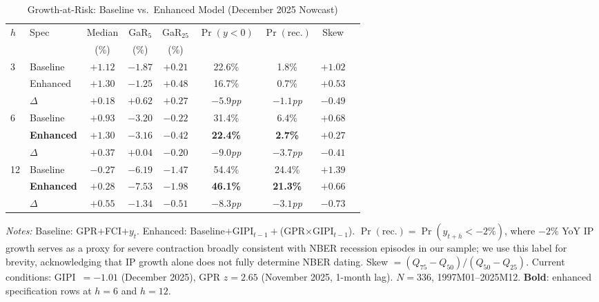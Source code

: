 \documentclass[12pt]{article}
\begin{document}
\begin{table}[htbp]\begin{center}
\caption{Growth-at-Risk: Baseline vs.\ Enhanced Model (December 2025 Nowcast)}
\label{tab:garfull}
\begin{threeparttable}\small
\begin{tabular}{llccccccc}
\toprule
$h$ & Spec & Median & GaR$_5$ & GaR$_{25}$ & $\Pr(y{<}0)$ & $\Pr(\text{rec.})$ & Skew\\
&& (\%) & (\%) & (\%) & & &\\
\midrule
\multirow{3}{*}{3}
& Baseline & $+1.12$ & $-1.87$ & $+0.21$ & 22.6\% & 1.8\% & $+1.02$\\
& Enhanced & $+1.30$ & $-1.25$ & $+0.48$ & 16.7\% & 0.7\% & $+0.53$\\
& \textit{$\Delta$} & \textit{$+0.18$} & \textit{$+0.62$} & \textit{$+0.27$} &
  \textit{$-5.9$pp} & \textit{$-1.1$pp} & \textit{$-0.49$}\\
\midrule
\multirow{3}{*}{6}
& Baseline & $+0.93$ & $-3.20$ & $-0.22$ & 31.4\% & 6.4\% & $+0.68$\\
& \textbf{Enhanced} & $\mathbf{+1.30}$ & $-3.16$ & $-0.42$ & \textbf{22.4\%} &
  \textbf{2.7\%} & $+0.27$\\
& \textit{$\Delta$} & \textit{$+0.37$} & \textit{$+0.04$} & \textit{$-0.20$} &
  \textit{$-9.0$pp} & \textit{$-3.7$pp} & \textit{$-0.41$}\\
\midrule
\multirow{3}{*}{12}
& Baseline & $-0.27$ & $-6.19$ & $-1.47$ & 54.4\% & 24.4\% & $+1.39$\\
& \textbf{Enhanced} & $\mathbf{+0.28}$ & $-7.53$ & $-1.98$ & \textbf{46.1\%} &
  \textbf{21.3\%} & $+0.66$\\
& \textit{$\Delta$} & \textit{$+0.55$} & \textit{$-1.34$} & \textit{$-0.51$} &
  \textit{$-8.3$pp} & \textit{$-3.1$pp} & \textit{$-0.73$}\\
\bottomrule
\end{tabular}
\begin{tablenotes}[flushleft]\footnotesize
\item \textit{Notes:}
Baseline: GPR$+$FCI$+y_t$.
Enhanced: Baseline$+$GIPI$_{t-1}+$(GPR$\times$GIPI$_{t-1}$).
$\Pr(\text{rec.}) = \Pr(y_{t+h}<-2\%)$, where $-2\%$ YoY IP growth
serves as a proxy for severe contraction broadly consistent with
NBER recession episodes in our sample; we use this label for
brevity, acknowledging that IP growth alone does not fully determine
NBER dating.
Skew $=(Q_{75}-Q_{50})/(Q_{50}-Q_{25})$.
Current conditions: GIPI~$=-1.01$ (December 2025), GPR $z=2.65$ (November 2025, 1-month lag).
$N=336$, 1997M01--2025M12.
\textbf{Bold}: enhanced specification rows at $h=6$ and $h=12$.
\end{tablenotes}
\end{threeparttable}
\end{center}\end{table}
\end{document}
